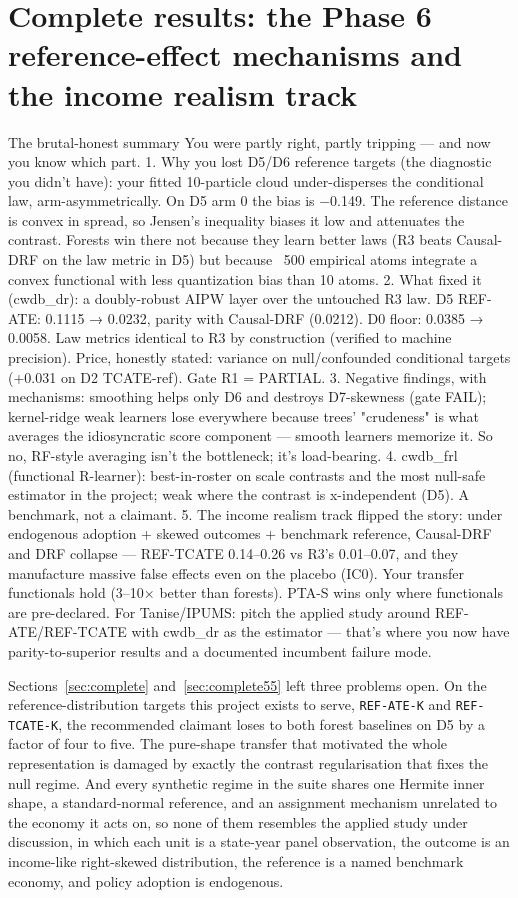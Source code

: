 \section{Complete results: the Phase 6 reference-effect mechanisms and the income realism track}
\label{sec:p6}

The brutal-honest summary
You were partly right, partly tripping — and now you know which part.
1. Why you lost D5/D6 reference targets (the diagnostic you didn't have): your fitted 10-particle cloud under-disperses the conditional law, arm-asymmetrically. On D5 arm 0 the bias is −0.149. The reference distance is convex in spread, so Jensen's inequality biases it low and attenuates the contrast. Forests win there not because they learn better laws (R3 beats Causal-DRF on the law metric in D5) but because ~500 empirical atoms integrate a convex functional with less quantization bias than 10 atoms.
2. What fixed it (cwdb_dr): a doubly-robust AIPW layer over the untouched R3 law. D5 REF-ATE: 0.1115 → 0.0232, parity with Causal-DRF (0.0212). D0 floor: 0.0385 → 0.0058. Law metrics identical to R3 by construction (verified to machine precision). Price, honestly stated: variance on null/confounded conditional targets (+0.031 on D2 TCATE-ref). Gate R1 = PARTIAL.
3. Negative findings, with mechanisms: smoothing helps only D6 and destroys D7-skewness (gate FAIL); kernel-ridge weak learners lose everywhere because trees' "crudeness" is what averages the idiosyncratic score component — smooth learners memorize it. So no, RF-style averaging isn't the bottleneck; it's load-bearing.
4. cwdb_frl (functional R-learner): best-in-roster on scale contrasts and the most null-safe estimator in the project; weak where the contrast is x-independent (D5). A benchmark, not a claimant.
5. The income realism track flipped the story: under endogenous adoption + skewed outcomes + benchmark reference, Causal-DRF and DRF collapse — REF-TCATE 0.14–0.26 vs R3's 0.01–0.07, and they manufacture massive false effects even on the placebo (IC0). Your transfer functionals hold (3–10× better than forests). PTA-S wins only where functionals are pre-declared.
For Tanise/IPUMS: pitch the applied study around REF-ATE/REF-TCATE with cwdb_dr as the estimator — that's where you now have parity-to-superior results and a documented incumbent failure mode.

Sections~\ref{sec:complete} and~\ref{sec:complete55} left three problems open.
On the reference-distribution targets this project exists to serve,
\texttt{REF-ATE-K} and \texttt{REF-TCATE-K}, the recommended claimant loses to
both forest baselines on D5 by a factor of four to five. The pure-shape
transfer that motivated the whole representation is damaged by exactly the
contrast regularisation that fixes the null regime. And every synthetic regime
in the suite shares one Hermite inner shape, a standard-normal reference, and
an assignment mechanism unrelated to the economy it acts on, so none of them
resembles the applied study under discussion, in which each unit is a
state-year panel observation, the outcome is an income-like right-skewed
distribution, the reference is a named benchmark economy, and policy adoption
is endogenous.

